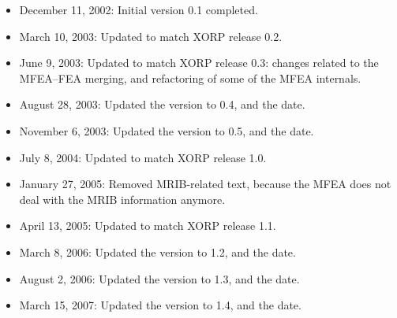 \documentclass[11pt]{article}
\begin{document}
\begin{itemize}

  \item December 11, 2002: Initial version 0.1 completed.

  \item March 10, 2003: Updated to match XORP release 0.2.

  \item June 9, 2003: Updated to match XORP release 0.3:
  changes related to the MFEA--FEA merging, and refactoring of
  some of the MFEA internals.

  \item August 28, 2003: Updated the version to 0.4, and the date.

  \item November 6, 2003: Updated the version to 0.5, and the date.

  \item July 8, 2004: Updated to match XORP release 1.0.

  \item January 27, 2005: Removed MRIB-related text, because the MFEA
  does not deal with the MRIB information anymore.

  \item April 13, 2005: Updated to match XORP release 1.1.

  \item March 8, 2006: Updated the version to 1.2, and the date.

  \item August 2, 2006: Updated the version to 1.3, and the date.

  \item March 15, 2007: Updated the version to 1.4, and the date.

\end{itemize}





\end{document}

